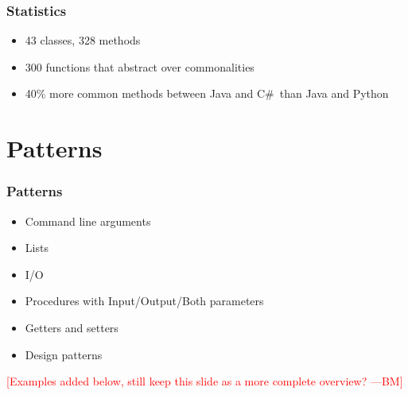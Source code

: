 \documentclass{beamer}
\newcommand{\authornote}[3]{\textcolor{#1}{[#3 ---#2]}}
\newcommand{\bmac}[1]{\authornote{red}{BM}{#1}}
\newcommand{\jc}[1]{\authornote{purple}{JC}{#1}}
\newcommand{\Csharp}{C\#}
\begin{document}
\begin{frame}

\frametitle{Statistics}

\begin{itemize}
  \item 43 classes, 328 methods
  \item 300 functions that abstract over commonalities
  \item 40\% more common methods between Java and \Csharp~than Java and Python
\end{itemize}


\end{frame}


\section[Patterns]{Patterns}


\begin{frame}

\frametitle{Patterns}

\begin{itemize}
  \item Command line arguments
  \item Lists
  \item I/O
  \item Procedures with Input/Output/Both parameters
  \item Getters and setters
  \item Design patterns
\end{itemize}

\bmac{Examples added below, still keep this slide as a more complete overview?}
\end{frame}
\end{document}
